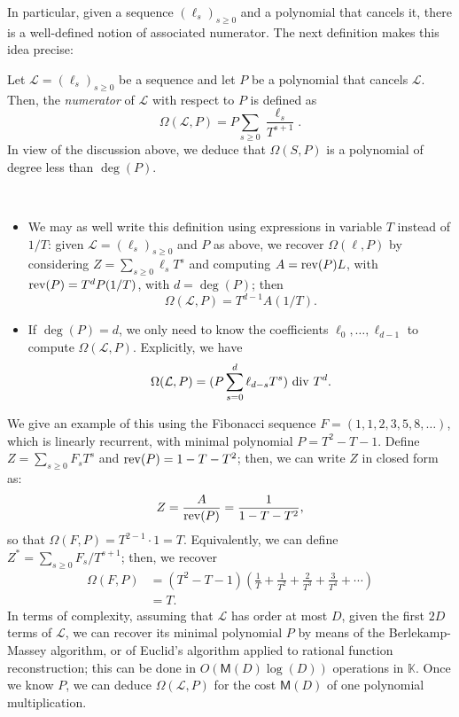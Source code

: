 \documentclass[12pt]{article}
\newcommand{\genseries}{Z}
\def\M {\ensuremath{\mathsf{M}}}
\def\K{\mathbb{K}}
\def\K {\ensuremath{\mathbb{K}}}
\begin{document}
In particular, given a sequence $(\ell_s)_{s \ge 0}$ and a polynomial
that cancels it, there is a well-defined notion of associated
numerator.  The next definition makes this idea precise:
\begin{definition}
  \label{def:omega}
  Let $\mathcal{L}=(\ell_s)_{s \ge 0}$ be a sequence and let $P$ be a
  polynomial that cancels $\mathcal{L}$. Then, the {\em numerator} of $\mathcal{L}$
  with respect to $P$ is defined as 
  $$\Omega(\mathcal{L},P) = P \sum_{s \ge 0} \frac {\ell_s}{T^{s+1}}.$$ In
  view of the discussion above, we deduce that $\Omega(S,P)$ is a
  polynomial of degree less than $\deg(P)$.
\end{definition}
\begin{remark}~
  \begin{itemize}
  \item We may as well write this definition using expressions in
    variable $T$ instead of $1/T$: given
    $\mathcal{L}=(\ell_s)_{s\ge0}$ and $P$ as above, we recover
    $\Omega(\ell,P)$ by considering $\genseries=\sum_{s\ge 0} \ell_s
    T^s$ and computing $A = {\rm rev}(P) L$, with ${\rm rev}(P)=T^d
    P(1/T)$, with $d=\deg(P)$; then
    $$\Omega(\mathcal{L} ,P) = T^{d - 1} A (1/T).$$ 
\item If $\deg(P)=d$, we only need to know the coefficients
  $\ell_0,\dots,\ell_{d-1}$ to compute $\Omega(\mathcal{L}, P)$. Explicitly, we 
  have
  $$\Omega(\mathcal{L},P) = ( P \sum_{s=0}^{d} \ell_{d - s} T^s ) {\rm ~div~} T^d.$$
 \end{itemize}
\end{remark}
We give an example of this using the Fibonacci sequence $F =
(1,1,2,3,5,8,\dots)$, which is linearly recurrent, with minimal
polynomial $P=T^2-T-1$. Define $\genseries= \sum_{s\ge 0} F_{s} T^s$ and
${\rm rev}(P) = 1-T-T^2$; then, we can write $\genseries$ in closed form as:
$$\genseries = \frac{A}{{\rm rev}(P)} = \frac{1}{1-T-T^2},$$
so that $\Omega(F,P)=T^{2-1} \cdot 1=T$. Equivalently, we can define $\genseries^* = \sum_{s\ge0} F_{s}/T^{s+1}$; then, 
we recover 
\begin{align*}
\Omega(F,P) &= (T^2-T-1)\left (\frac 1T +\frac 1{T^2} + \frac 2{T^3} + \frac 3{T^4} + \cdots \right ) \\
&=T.
\end{align*}
In terms of complexity, assuming that $\mathcal{L}$ has order at most $D$,
given the first $2D$ terms of $\mathcal{L}$, we can recover its minimal
polynomial $P$ by means of the Berlekamp-Massey algorithm, or of Euclid's
algorithm applied to rational function reconstruction; this can be done
in $O(\M(D)\log(D))$ operations in $\K$. Once we know $P$, we can
deduce $\Omega(\mathcal{L},P)$ for the cost $\M(D)$ of one polynomial multiplication.
\end{document}
